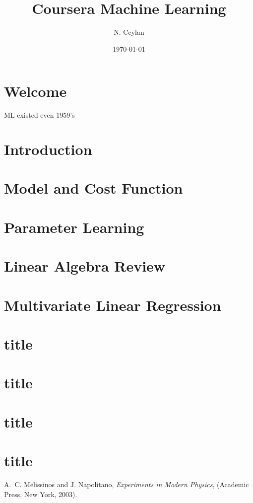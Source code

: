 \documentclass[letterpaper,12pt]{article}
\begin{document}
\title{Coursera Machine Learning}
\author{N. Ceylan}
\date{\today}
\maketitle






\section{Welcome}

ML existed even 1959's

\section{Introduction}
\section{Model and Cost Function}


\section{Parameter Learning}


\section{Linear Algebra Review}
\section{Multivariate Linear Regression}

\section{title}

\section{title}

\section{title}

\section{title}



\begin{thebibliography}{99}

A.~C. Melissinos and J. Napolitano, \textit{Experiments in Modern Physics},
(Academic Press, New York, 2003).


\end{thebibliography}
\end{document}
